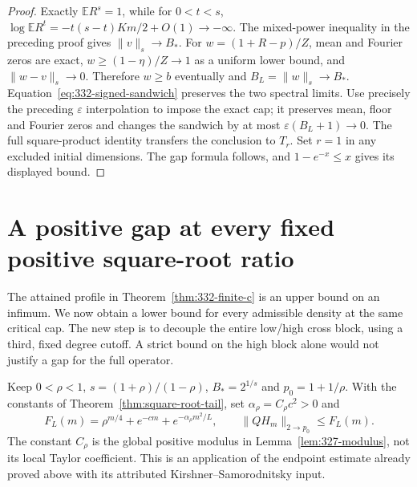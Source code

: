 \documentclass[11pt]{article}
\begin{document}
\begin{proof}
Exactly $\mathbb E R^s=1$, while for $0<t<s$,
$\log\mathbb E R^t=-t(s-t)Km/2+O(1)\to-\infty$.
The mixed-power inequality in the preceding proof gives
$\|v\|_s\to B_*$. For $w=(1+R-p)/Z$, mean and Fourier zeros are exact,
$w\ge(1-\eta)/Z\to1$ as a uniform lower bound, and
$\|w-v\|_s\to0$. Therefore $w\ge b$ eventually and
$B_L=\|w\|_s\to B_*$. Equation~\eqref{eq:332-signed-sandwich}
preserves the two spectral limits. Use precisely the preceding
$\varepsilon$ interpolation to impose the exact cap; it preserves
mean, floor and Fourier zeros and changes the sandwich by at most
$\varepsilon(B_L+1)\to0$. The full square-product identity transfers
the conclusion to $T_r$. Set $r=1$ in any excluded initial dimensions.
The gap formula follows, and $1-e^{-x}\le x$ gives its displayed bound.
\end{proof}

\section{A positive gap at every fixed positive square-root ratio}
\label{sec:finite-c-positive}
The attained profile in Theorem~\ref{thm:332-finite-c} is an upper
bound on an infimum. We now obtain a lower bound for every admissible
density at the same critical cap. The new step is to decouple the entire
low/high cross block, using a third, fixed degree cutoff. A strict bound
on the high block alone would not justify a gap for the full operator.

Keep $0<\rho<1$, $s=(1+\rho)/(1-\rho)$, $B_*=2^{1/s}$ and
$p_0=1+1/\rho$. With the constants of
Theorem~\ref{thm:square-root-tail}, set $\alpha_\rho=C_\rho c^2>0$ and
\begin{equation}\label{eq:335-F}
 F_L(m)=\rho^{m/4}+e^{-cm}+e^{-\alpha_\rho m^2/L},
 \qquad \|QH_m\|_{2\to p_0}\le F_L(m).
\end{equation}
The constant $C_\rho$ is the global positive modulus in
Lemma~\ref{lem:327-modulus}, not its local Taylor coefficient.
This is an application of the endpoint estimate already proved above
with its attributed Kirshner--Samorodnitsky input.
\end{document}
